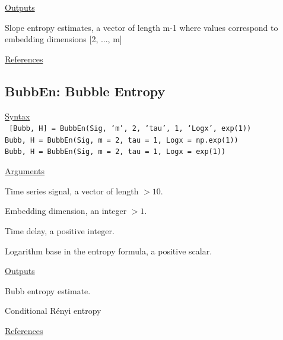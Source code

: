 \documentclass[12pt, a4paper, titlepage, openany]{book}
\begin{document}
\noindent \ul{Outputs}
\begin{description}[labelsep=1cm, labelwidth=2cm, nosep, style=multiline,leftmargin=3cm]\footnotesize
\item[\texttt{Slop}]	Slope entropy estimates, a vector of length m-1 where values correspond to embedding dimensions [2, ..., m]
\end{description}

\noindent \ul{References}\hspace{1cm}
\cite{Slop1}



\newpage
\subsection{\normalsize BubbEn: \hspace{15mm} Bubble Entropy}\label{BubbEn}
\noindent\ul{Syntax} \vspace{6mm} \\ \noindent \texttt{\footnotesize
[Bubb, H] = BubbEn(Sig, ‘m’, 2, ‘tau’, 1, ‘Logx’, exp(1)) \\
Bubb, H = BubbEn(Sig, m = 2, tau = 1, Logx = np.exp(1)) \\
Bubb, H = BubbEn(Sig, m = 2, tau = 1, Logx = exp(1))}

\noindent \ul{Arguments}
\begin{description}[labelsep=1cm, labelwidth=2cm, nosep, style=multiline,leftmargin=3cm]\footnotesize
\item[\texttt{Sig}]		Time series signal, a vector of length $> 10$.
\item[\texttt{m}]		Embedding dimension, an integer $ > 1$.
\item[\texttt{tau}]		Time delay, a positive integer.
\item[\texttt{Logx}]	Logarithm base in the entropy formula, a positive scalar.\\
\end{description}

\noindent \ul{Outputs}
\begin{description}[labelsep=1cm, labelwidth=2cm, nosep, style=multiline,leftmargin=3cm]\footnotesize
\item[\texttt{Bubb}]	Bubb entropy estimate.
\item[\texttt{H}]	Conditional Rényi entropy
\end{description}

\noindent \ul{References}\hspace{1cm}
\cite{Bubb1}
\end{document}
